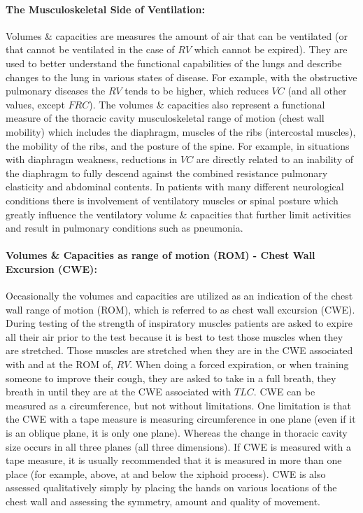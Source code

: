 \paragraph{The Musculoskeletal Side of Ventilation:} Volumes \& capacities are measures the amount of air that can be ventilated (or that cannot be ventilated in the case of $RV$ which cannot be expired). They are used to better understand the functional capabilities of the lungs and describe changes to the lung in various states of disease. For example, with the obstructive pulmonary diseases the $RV$ tends to be higher, which reduces $VC$ (and all other values, except $FRC$). The volumes \& capacities also represent a functional measure of the thoracic cavity musculoskeletal range of motion (chest wall mobility) which includes the diaphragm, muscles of the ribs (intercostal muscles), the mobility of the ribs, and the posture of the spine. For example, in situations with diaphragm weakness, reductions in $VC$ are directly related to an inability of the diaphragm to fully descend against the combined resistance pulmonary elasticity and abdominal contents. In patients with many different neurological conditions there is involvement of ventilatory muscles or spinal posture which greatly influence the ventilatory volume \& capacities that further limit activities and result in pulmonary conditions such as pneumonia.

\paragraph{Volumes \& Capacities as range of motion (ROM) - Chest Wall Excursion (CWE):} Occasionally the volumes and capacities are utilized as an indication of the chest wall range of motion (ROM), which is referred to as chest wall excursion (CWE). During testing of the strength of inspiratory muscles patients are asked to expire all their air prior to the test because it is best to test those muscles when they are stretched. Those muscles are stretched when they are in the CWE associated with and at the ROM of, $RV$. When doing a forced expiration, or when training someone to improve their cough, they are asked to take in a full breath, they breath in until they are at the CWE associated with $TLC$. CWE can be measured as a circumference, but not without limitations. One limitation is that the CWE with a tape measure is measuring circumference in one plane (even if it is an oblique plane, it is only one plane). Whereas the change in thoracic cavity size occurs in all three planes (all three dimensions). If CWE is measured with a tape measure, it is usually recommended that it is measured in more than one place (for example, above, at and below the xiphoid process). CWE is also assessed qualitatively simply by placing the hands on various locations of the chest wall and assessing the symmetry, amount and quality of movement.

